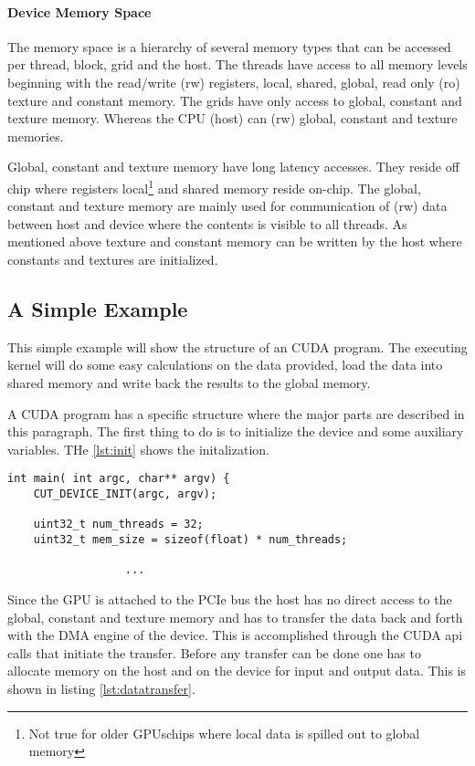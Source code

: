 \paragraph{Device Memory Space} %
\label{par:device_memory_space}
The memory space is a hierarchy of several memory types that can be accessed per
thread, block, grid and the host. The threads have access to all memory levels
beginning with the read/write (rw) registers, local, shared, global, read only
(ro) texture and constant memory. The grids have only access to global, constant
and texture memory. Whereas the CPU (host) can (rw) global, constant and texture
memories.

Global, constant and texture memory have long latency accesses. They reside off
chip where registers local\footnote{Not true for older \glspl{GPU}chips where local
data is spilled out to global memory} and shared memory reside on-chip. The
global, constant and texture memory are mainly used for communication of (rw)
data between host and device where the contents is visible to all threads. As
mentioned above texture and constant memory can be written by the host where
constants and textures are initialized.


\subsection*{A Simple Example} %
\label{sub:a_simple_example}
This simple example will show the structure of an \gls{CUDA} program. The executing
kernel will do some easy calculations on the data provided, load the data into
shared memory  and write back the results to the global memory. 

A \gls{CUDA} program has a specific structure where the major parts are described in
this paragraph. The first thing to do is to initialize the device and some
auxiliary variables. THe \autoref{lst:init} shows the initalization.

%
\begin{lstlisting}[caption=Hardware initalization, label=lst:init]
int main( int argc, char** argv) {
	CUT_DEVICE_INIT(argc, argv);

	uint32_t num_threads = 32;
	uint32_t mem_size = sizeof(float) * num_threads;
	    							
                  ...
\end{lstlisting}
%

Since the \gls{GPU} is attached to the PCIe bus the host has no direct access to 
the global, constant and texture memory and has to transfer the data back
and forth with the DMA engine of the device. This is accomplished through the 
CUDA api calls that initiate the transfer. Before any transfer can be done
one has to allocate memory on the host and on the device for input and output
data. This is shown in listing \autoref{lst:datatransfer}.


